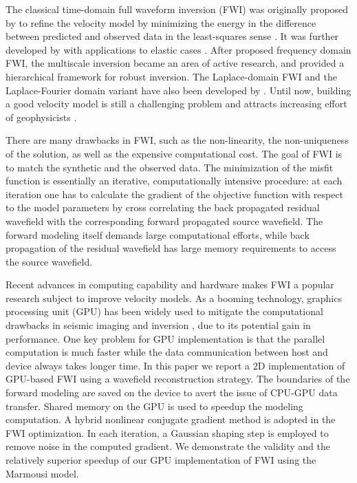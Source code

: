 The classical time-domain full waveform inversion (FWI) was originally proposed by \cite{tarantola1984inversion} to refine the velocity model by minimizing the energy in the difference between predicted and observed data in the least-squares sense \citep{symes2008migration}. It was further developed by \cite{tarantola1986strategy} with applications to elastic cases \citep{pica1990nonlinear}. 
After \cite{pratt1998gauss} proposed frequency domain FWI, the multiscale inversion became an area of active research, and provided a hierarchical framework for robust inversion. The Laplace-domain FWI and the Laplace-Fourier domain variant have also been developed by \cite{shin2008waveform,shin2009waveform}. Until now, building a good velocity model is still a challenging problem and attracts increasing effort of geophysicists \citep{virieux2009overview}. 

There are many drawbacks in FWI, such as the non-linearity, the non-uniqueness of the solution, as well as the expensive computational cost. The goal of FWI is to match the synthetic and the observed data.
The minimization of the misfit function is essentially an iterative, computationally intensive procedure: at each iteration one has to calculate the gradient of the objective function with respect to the model parameters by cross correlating the back propagated residual wavefield with the corresponding forward propagated source wavefield. The forward modeling itself demands large computational efforts, while back propagation of the residual wavefield has large memory requirements to access the source wavefield. 

Recent advances in computing capability and hardware makes FWI a popular research subject to improve velocity models. As a booming technology, graphics processing unit (GPU) has been widely used to mitigate the computational drawbacks in seismic imaging \citep{micikevicius20093d,Yang201464} and inversion \citep{boonyasiriwat2010multisource,shin20143d}, due to its potential gain in performance. 
One key problem for GPU implementation is that the parallel computation is much faster while the data communication between host and device always takes longer time.  In this paper we report a 2D implementation of  GPU-based FWI using a wavefield reconstruction strategy. The boundaries of the forward modeling are saved on the device to avert the issue of CPU-GPU data transfer. Shared memory on the GPU is used to speedup the modeling computation. A hybrid nonlinear conjugate gradient method is adopted in the FWI optimization.  In each iteration, a Gaussian shaping step is employed to remove noise in the computed gradient. We demonstrate the validity and the relatively superior speedup of our GPU implementation of FWI using the Marmousi model.


